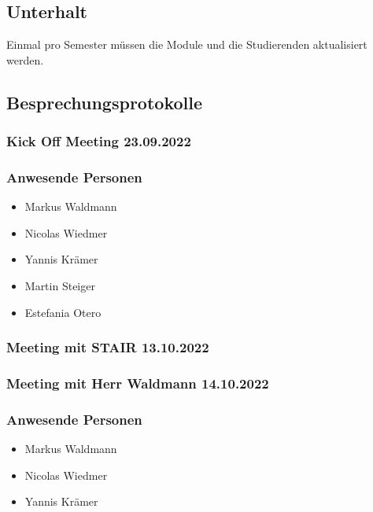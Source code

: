 \documentclass[a4paper, table]{article}
\begin{document}
\subsection{Unterhalt}

Einmal pro Semester müssen die Module und die Studierenden aktualisiert werden.

\subsection{Besprechungsprotokolle}

\subsubsection{Kick Off Meeting 23.09.2022}

\subsubsection*{Anwesende Personen}

\begin{itemize}
    \item Markus Waldmann
    \item Nicolas Wiedmer
    \item Yannis Krämer
    \item Martin Steiger
    \item Estefania Otero
\end{itemize}

\subsubsection{Meeting mit STAIR 13.10.2022}

\subsubsection{Meeting mit Herr Waldmann 14.10.2022}

\subsubsection*{Anwesende Personen}

\begin{itemize}
    \item Markus Waldmann
    \item Nicolas Wiedmer
    \item Yannis Krämer
\end{itemize}
\end{document}
